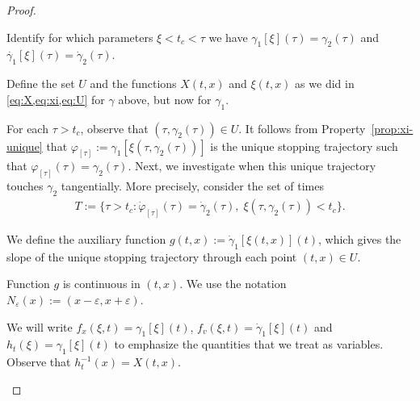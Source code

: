 \documentclass[a4paper]{article}
\theoremstyle{definition}
\theoremstyle{plain}
\begin{document}
\begin{proof}

\phantom{.}
\begin{outline}



  \1 Identify for which parameters $\xi < t_{c} < \tau$ we have
  $\gamma_{1}[\xi](\tau) = \gamma_{2}(\tau)$ and $\dot{\gamma_{1}}[\xi](\tau) = \dot{\gamma}_{2}(\tau)$.

  \2 Define the set $U$ and the functions $X(t, x)$ and $\xi(t, x)$ as we did in
  \cref{eq:X,eq:xi,eq:U} for $\gamma$ above, but now for $\gamma_{1}$.

  \2 For each $\tau > t_{c}$, observe that $(\tau, \gamma_{2}(\tau)) \in U$. It follows
  from Property~\ref{prop:xi-unique} that
  $\varphi_{[\tau]} := \gamma_{1}[\xi(\tau, \gamma_{2}(\tau))]$ is the unique stopping trajectory such
  that $\varphi_{[\tau]}(\tau) = \gamma_{2}(\tau)$.
  Next, we investigate when this unique trajectory touches $\gamma_{2}$
  tangentially. More precisely, consider the set of times
  \begin{align}
    T := \{ \tau > t_{c} : \dot{\varphi}_{[\tau]}(\tau) = \dot{\gamma}_{2}(\tau), \; \xi(\tau, \gamma_{2}(\tau)) < t_{c} \}.
  \end{align}

  \2 We define the auxiliary function $g(t, x) := \dot{\gamma}_{1}[\xi(t, x)](t)$,
  which gives the slope of the unique stopping trajectory through each point
  $(t, x) \in U$.

  \1 Function $g$ is continuous in $(t, x)$. We use the notation
  $N_{\varepsilon}(x) := (x - \varepsilon, x + \varepsilon)$.

  \2 We will write $f_{x}(\xi, t) = \gamma_{1}[\xi](t)$,
  $f_{v}(\xi, t) = \dot{\gamma}_{1}[\xi](t)$ and
  $h_{t}(\xi) = \gamma_{1}[\xi](t)$ to emphasize the quantities that we treat as
  variables. Observe that $h_{t}^{-1}(x) = X(t, x)$.


\end{outline}
\end{proof}
\end{document}
